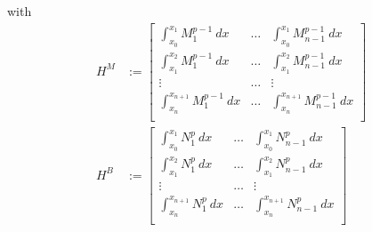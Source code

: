 with
\begin{align}
  H^{M} &:= 
  \begin{bmatrix}
    \int_{x_0}^{x_{1}}M_1^{p-1} ~dx   & \ldots & \int_{x_0}^{x_{1}}M_{n-1}^{p-1} ~dx   \\
    \int_{x_1}^{x_{2}}M_1^{p-1} ~dx   & \ldots & \int_{x_1}^{x_{2}}M_{n-1}^{p-1} ~dx   \\
    \vdots                        & \ldots &                        \vdots \\
    \int_{x_n}^{x_{n+1}}M_1^{p-1} ~dx & \ldots & \int_{x_n}^{x_{n+1}}M_{n-1}^{p-1} ~dx \\
  \end{bmatrix}
  \\
  H^{B} &:= 
  \begin{bmatrix}
    \int_{x_0}^{x_{1}}N_1^p ~dx   & \ldots & \int_{x_0}^{x_{1}}N_{n-1}^p ~dx   \\
    \int_{x_1}^{x_{2}}N_1^p ~dx   & \ldots & \int_{x_1}^{x_{2}}N_{n-1}^p ~dx   \\
    \vdots                        & \ldots &                        \vdots \\
    \int_{x_n}^{x_{n+1}}N_1^p ~dx & \ldots & \int_{x_n}^{x_{n+1}}N_{n-1}^p ~dx \\
  \end{bmatrix}
  \label{eq:histopolation-h10}
\end{align}
